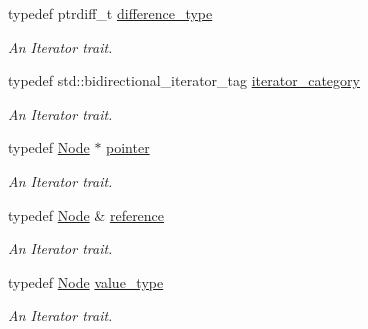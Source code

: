 \begin{DoxyCompactItemize}
\item 
\hypertarget{classphys_1_1xml_1_1NodeIterator_a0d7f40ce76602a5cc74616545d5c6076}{
typedef ptrdiff\_\-t \hyperlink{classphys_1_1xml_1_1NodeIterator_a0d7f40ce76602a5cc74616545d5c6076}{difference\_\-type}}
\label{classphys_1_1xml_1_1NodeIterator_a0d7f40ce76602a5cc74616545d5c6076}

\begin{DoxyCompactList}\small\item\em An Iterator trait. \item\end{DoxyCompactList}\item 
\hypertarget{classphys_1_1xml_1_1NodeIterator_abf077d34ecc13ff336f87a18a6d0fa09}{
typedef std::bidirectional\_\-iterator\_\-tag \hyperlink{classphys_1_1xml_1_1NodeIterator_abf077d34ecc13ff336f87a18a6d0fa09}{iterator\_\-category}}
\label{classphys_1_1xml_1_1NodeIterator_abf077d34ecc13ff336f87a18a6d0fa09}

\begin{DoxyCompactList}\small\item\em An Iterator trait. \item\end{DoxyCompactList}\item 
\hypertarget{classphys_1_1xml_1_1NodeIterator_ad50b430887341d1cad3a655f5363c2e2}{
typedef \hyperlink{classphys_1_1xml_1_1Node}{Node} $\ast$ \hyperlink{classphys_1_1xml_1_1NodeIterator_ad50b430887341d1cad3a655f5363c2e2}{pointer}}
\label{classphys_1_1xml_1_1NodeIterator_ad50b430887341d1cad3a655f5363c2e2}

\begin{DoxyCompactList}\small\item\em An Iterator trait. \item\end{DoxyCompactList}\item 
\hypertarget{classphys_1_1xml_1_1NodeIterator_a7e9f8c536d367f3d9af80ee0b749e36f}{
typedef \hyperlink{classphys_1_1xml_1_1Node}{Node} \& \hyperlink{classphys_1_1xml_1_1NodeIterator_a7e9f8c536d367f3d9af80ee0b749e36f}{reference}}
\label{classphys_1_1xml_1_1NodeIterator_a7e9f8c536d367f3d9af80ee0b749e36f}

\begin{DoxyCompactList}\small\item\em An Iterator trait. \item\end{DoxyCompactList}\item 
\hypertarget{classphys_1_1xml_1_1NodeIterator_a41a1bf31ea149a9a58d60c52e24234ab}{
typedef \hyperlink{classphys_1_1xml_1_1Node}{Node} \hyperlink{classphys_1_1xml_1_1NodeIterator_a41a1bf31ea149a9a58d60c52e24234ab}{value\_\-type}}
\label{classphys_1_1xml_1_1NodeIterator_a41a1bf31ea149a9a58d60c52e24234ab}

\begin{DoxyCompactList}\small\item\em An Iterator trait. \item\end{DoxyCompactList}\end{DoxyCompactItemize}
